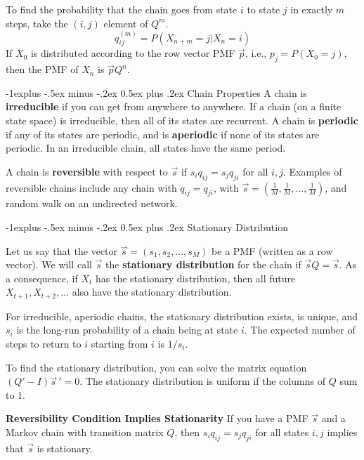 \documentclass[10pt,landscape]{article}
\makeatletter
\renewcommand{\subsection}{\@startsection{subsection}{2}{0mm}%
                                {-1explus -.5ex minus -.2ex}%
                                {0.5ex plus .2ex}%
                                {\normalfont\normalsize\bfseries}}
\makeatother
\begin{document}
\begin{multicols*}{3}
To find the probability that the chain goes from state $i$ to state $j$ in exactly $m$ steps, take the $(i, j)$ element of $Q^m$.
\[q^{(m)}_{ij} = P(X_{n+m} = j | X_n = i)\]
If $X_0$ is distributed according to the row vector PMF $\vec{p}$, i.e., $p_j = P(X_0 = j)$, then the PMF of $X_n$ is $\vec{p}Q^n$.



\subsection{Chain Properties}
A chain is \textbf{irreducible} if you can get from anywhere to anywhere. If a chain (on a finite state space) is irreducible, then all of its states are recurrent. A chain is \textbf{periodic} if any of its states are periodic, and is \textbf{aperiodic} if none of its states are periodic. In an irreducible chain, all states have the same period. \medskip

A chain is \textbf{reversible} with respect to $\vec{s}$ if $s_iq_{ij} = s_jq_{ji}$ for all $i, j$.  Examples of reversible chains include any chain with $q_{ij} = q_{ji}$, with $\vec{s} = (\frac{1}{M}, \frac{1}{M}, \dots, \frac{1}{M})$, and random walk on an undirected network.

\subsection{Stationary Distribution}

Let us say that the vector $\vec{s} = (s_1, s_2, \dots, s_M)$ be a PMF  (written as a row vector). We will call $\vec{s}$ the \textbf{stationary distribution} for the chain if $\vec{s}Q = \vec{s}$. As a consequence, if $X_t$ has the stationary distribution, then all future $X_{t+1}, X_{t + 2}, \dots$ also have the stationary distribution. \\

\smallskip

For irreducible, aperiodic chains, the stationary distribution exists, is unique, and $s_i$ is the long-run probability of a chain being at state $i$. The expected number of steps to return to $i$ starting from $i$ is $1/s_i$.

\smallskip

 To find the stationary distribution, you can solve the matrix equation $(Q' - I){\vec{s}\,}'= 0$. The stationary distribution is uniform if the columns of $Q$ sum to 1.

\smallskip

\textbf{Reversibility Condition Implies Stationarity}  If you have a PMF $\vec{s}$ and a Markov chain with transition matrix $Q$, then $s_iq_{ij} = s_jq_{ji}$ for all states $i, j$ implies that $\vec{s}$ is stationary.


\end{multicols*}
\end{document}
